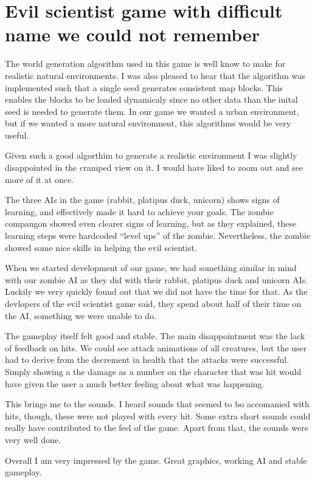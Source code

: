\section{Evil scientist game with difficult name we could not remember}

The world generation algorithm used in this game is well know to make for realistic natural environments. I was also pleased to hear that the algorithm was implemented such that a single seed generates consistent map blocks. This enables the blocks to be loaded dynamicaly since no other data than the inital seed is needed to generate them. In our game we wanted a urban environment, but if we wanted a more natural environment, this algorithms would be very useful.

Given such a good algorthim to generate a realistic environment I was slightly disappointed in the cramped view on it. I would have liked to zoom out and see more of it at once.


The three AIs in the game (rabbit, platipus duck, unicorn) shows signs of learning, and effectively made it hard to achieve your goals. The zombie compangon showed even clearer signs of learning, but as they explained, these learning steps were hardcoded ``level ups'' of the zombie. Nevertheless, the zombie showed some nice skills in helping the evil scientist.

When we started development of our game, we had something similar in mind with our zombie AI as they did with their rabbit, platipus duck and unicorn AIs. Luckily we very quickly found out that we did not have the time for that. As the devlopers of the evil scientist game said, they spend about half of their time on the AI, something we were unable to do.

The gameplay itself felt good and stable. The main disappointment was the lack of feedback on hits. We could see attack animations of all creatures, but the user had to derive from the decrement in health that the attacks were successful. Simply showing a the damage as a number on the character that was hit would have given the user a much better feeling about what was happening.

This brings me to the sounds. I heard sounds that seemed to bo accomanied with hits, though, these were not played with every hit. Some extra short sounds could really have contributed to the feel of the game. Apart from that, the sounds were very well done.

Overall I am very impressed by the game. Great graphics, working AI and stable gameplay.